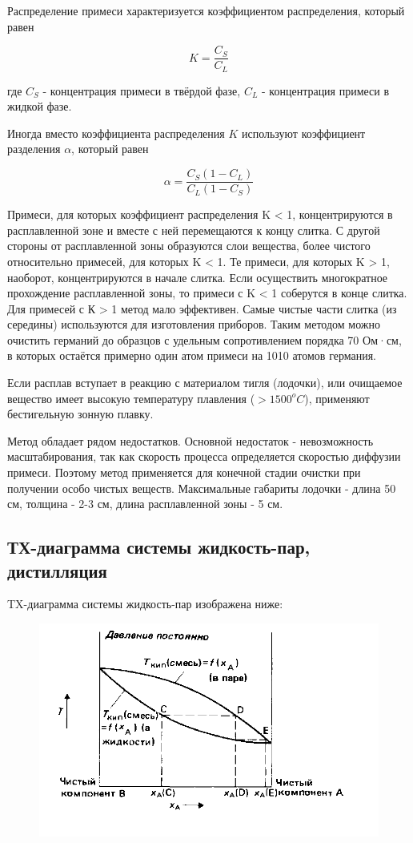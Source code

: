 \documentclass[14pt,a4paper]{scrartcl}
\begin{document}
Распределение примеси характеризуется коэффициентом распределения, который равен

$$ K={\frac {C_{S}}{C_{L}}}$$

где $C_S$ - концентрация примеси в твёрдой фазе, $C_L$ - концентрация примеси в жидкой фазе.

Иногда вместо коэффициента распределения $K$ используют коэффициент разделения $\alpha$, который равен

$$\alpha ={\frac {C_{S}(1-C_{L})}{C_{L}(1-C_{S})}}$$

Примеси, для которых коэффициент распределения K < 1, концентрируются в расплавленной зоне и вместе с ней перемещаются к концу слитка. С другой стороны от расплавленной зоны образуются слои вещества, более чистого относительно примесей, для которых K < 1. Те примеси, для которых K > 1, наоборот, концентрируются в начале слитка. Если осуществить многократное прохождение расплавленной зоны, то примеси с K < 1 соберутся в конце слитка. Для примесей с К > 1 метод мало эффективен. Самые чистые части слитка (из середины) используются для изготовления приборов. Таким методом можно очистить германий до образцов с удельным сопротивлением порядка 70 Ом·см, в которых остаётся примерно один атом примеси на 1010 атомов германия.

Если расплав вступает в реакцию с материалом тигля (лодочки), или очищаемое вещество имеет высокую температуру плавления ($>1500^o C$), применяют бестигельную зонную плавку.

Метод обладает рядом недостатков. Основной недостаток - невозможность масштабирования, так как скорость процесса определяется скоростью диффузии примеси. Поэтому метод применяется для конечной стадии очистки при получении особо чистых веществ. Максимальные габариты лодочки - длина 50 см, толщина - 2-3 см, длина расплавленной зоны - 5 см.
\subsection*{ТХ-диаграмма системы жидкость-пар, дистилляция}
TX-диаграмма системы жидкость-пар изображена ниже:
\begin{figure}[H]
\centering
\includegraphics[scale=1.50]{vapor-diagram.png}
\caption{}
\label{}
\end{figure}
\end{document}
